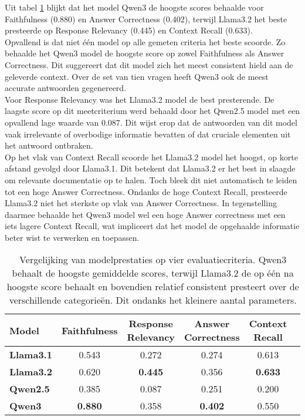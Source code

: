 Uit tabel \ref{tab:modelvergelijking} blijkt dat het model Qwen3 de hoogste scores behaalde voor Faithfulness (0.880) en Answer Correctness (0.402), terwijl Llama3.2 het beste presteerde op Response Relevancy (0.445) en Context Recall (0.633). 
\\[1em]
Opvallend is dat niet één model op alle gemeten criteria het beste scoorde. Zo behaalde het Qwen3 model de hoogste score op zowel Faithfulness als Answer Correctness. Dit suggereert dat dit model zich het meest consistent hield aan de geleverde context. Over de set van tien vragen heeft Qwen3 ook de meest accurate antwoorden gegenereerd.
\\[1em]
Voor Response Relevancy was het Llama3.2 model de best presterende. De laagste score op dit meetcriterium werd behaald door het Qwen2.5 model met een opvallend lage waarde van 0.087. Dit wijst erop dat de antwoorden van dit model vaak irrelevante of overbodige informatie bevatten of dat cruciale elementen uit het antwoord ontbraken.
\\[1em]
Op het vlak van Context Recall scoorde het Llama3.2 model het hoogst, op korte afstand gevolgd door Llama3.1. Dit betekent dat Llama3.2 er het best in slaagde om relevante documentatie op te halen. Toch bleek dit niet automatisch te leiden tot een hoge Answer Correctness. Ondanks de hoge Context Recall, presteerde Llama3.2 niet het sterkste op vlak van Answer Correctness. In tegenstelling daarmee behaalde het Qwen3 model wel een hoge Answer correctness met een iets lagere Context Recall, wat impliceert dat het model de opgehaalde informatie beter wist te verwerken en toepassen.

\begin{table}[H]
    \begin{tabular}{|l|c|c|c|c|c|}
        \hline
        \textbf{Model} & \textbf{Faithfulness} & \textbf{Response Relevancy} & \textbf{Answer Correctness} & \textbf{Context Recall} \\
        \hline
        \textbf{Llama3.1} & 0.543 & 0.272 & 0.274 & 0.613 \\
        \textbf{Llama3.2} & 0.620 & \textbf{0.445} & 0.356 & \textbf{0.633} \\
        \textbf{Qwen2.5}  & 0.385 & 0.087 & 0.251 & 0.200 \\
        \textbf{Qwen3}    & \textbf{0.880} & 0.358 & \textbf{0.402} & 0.550 \\
        \hline
    \end{tabular}
    \caption{Vergelijking van modelprestaties op vier evaluatiecriteria. Qwen3 behaalt de hoogste gemiddelde scores, terwijl Llama3.2 de op één na hoogste score behaalt en bovendien relatief consistent presteert over de verschillende categorieën. Dit ondanks het kleinere aantal parameters.}
    \label{tab:modelvergelijking}
\end{table}

